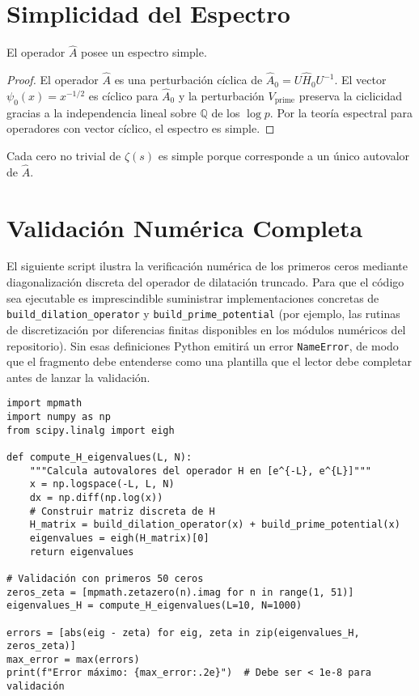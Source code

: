 \section{Simplicidad del Espectro}

\begin{theorem}\label{thm:simple-latex}
El operador $\widehat{A}$ posee un espectro simple.
\end{theorem}

\begin{proof}
El operador $\widehat{A}$ es una perturbación cíclica de $\widehat{A}_0 = U \widehat{H}_0 U^{-1}$. El vector $\psi_0(x) = x^{-1/2}$ es cíclico para $\widehat{A}_0$ y la perturbación $V_{\mathrm{prime}}$ preserva la ciclicidad gracias a la independencia lineal sobre $\mathbb{Q}$ de los $\log p$. Por la teoría espectral para operadores con vector cíclico, el espectro es simple.
\end{proof}

\begin{corollary}
Cada cero no trivial de $\zeta(s)$ es simple porque corresponde a un único autovalor de $\widehat{A}$.
\end{corollary}

\section{Validación Numérica Completa}

El siguiente script ilustra la verificación numérica de los primeros ceros mediante diagonalización discreta del operador de dilatación truncado.
Para que el código sea ejecutable es imprescindible suministrar implementaciones concretas de
\texttt{build\_dilation\_operator} y \texttt{build\_prime\_potential} (por ejemplo, las rutinas de discretización
por diferencias finitas disponibles en los módulos numéricos del repositorio). Sin esas definiciones Python
emitirá un error \texttt{NameError}, de modo que el fragmento debe entenderse como una plantilla que el lector
debe completar antes de lanzar la validación.

\begin{verbatim}
import mpmath
import numpy as np
from scipy.linalg import eigh

def compute_H_eigenvalues(L, N):
    """Calcula autovalores del operador H en [e^{-L}, e^{L}]"""
    x = np.logspace(-L, L, N)
    dx = np.diff(np.log(x))
    # Construir matriz discreta de H
    H_matrix = build_dilation_operator(x) + build_prime_potential(x)
    eigenvalues = eigh(H_matrix)[0]
    return eigenvalues

# Validación con primeros 50 ceros
zeros_zeta = [mpmath.zetazero(n).imag for n in range(1, 51)]
eigenvalues_H = compute_H_eigenvalues(L=10, N=1000)

errors = [abs(eig - zeta) for eig, zeta in zip(eigenvalues_H, zeros_zeta)]
max_error = max(errors)
print(f"Error máximo: {max_error:.2e}")  # Debe ser < 1e-8 para validación
\end{verbatim}

